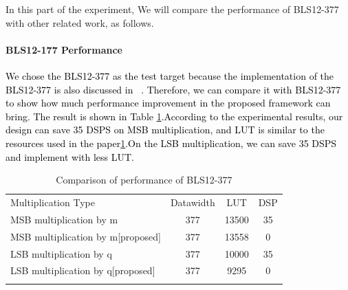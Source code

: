 \documentclass[conference]{IEEEtran}
\begin{document}
In this part of the experiment, We will compare the performance of BLS12-377 with other related work, as follows.


\paragraph {BLS12-177 Performance}
\textcolor{black}{
We chose the BLS12-377 as the test target because the implementation of the BLS12-377 is also discussed in ~\cite{PipeMSM}. Therefore, we can compare it with BLS12-377 to show how much performance improvement in the proposed framework can bring. The result is shown in Table \ref{performance of VU9P under 377 bits}.According to the experimental results, our design can save 35 DSPS on MSB multiplication, and LUT is similar to the resources used in the paper\ref{performance of VU9P under 377 bits}.On the LSB multiplication, we can save 35 DSPS and implement with less LUT.
}
\begin{table}[h]
    \centering
    \caption{Comparison of performance of BLS12-377}
    \renewcommand{\arraystretch}{1.5}
    \begin{tabular}{l|c|c|c}
                \Xhline{1.5pt}
                Multiplication Type               & Datawidth &   LUT  &  DSP  \\
                \Xhline{1pt}
                MSB multiplication by m           &    377    &    13500    &     35  \\ 
                \Xhline{1pt}
                MSB multiplication by m[proposed] &     377      &  13558      &    0   \\ 
                \Xhline{1pt}
                LSB multiplication by q           &    377    &   10000     &    35   \\ 
                \Xhline{1pt}
                LSB multiplication by q[proposed] &     377      & 9295       &    0   \\ 
                \Xhline{1.5pt}    
    \end{tabular}
    \label{performance of VU9P under 377 bits}
\end{table}
\end{document}

